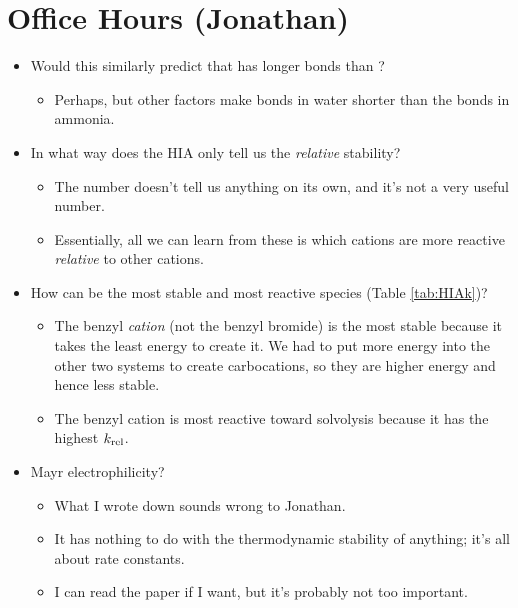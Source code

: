 \documentclass[../notes.tex]{subfiles}
\begin{document}
\section{Office Hours (Jonathan)}
\begin{itemize}
    \item Would this similarly predict that  has longer bonds than ?
    \begin{itemize}
        \item Perhaps, but other factors make  bonds in water shorter than the  bonds in ammonia.
    \end{itemize}
    \item In what way does the HIA only tell us the \emph{relative} stability?
    \begin{itemize}
        \item The number doesn't tell us anything on its own, and it's not a very useful number.
        \item Essentially, all we can learn from these is which cations are more reactive \emph{relative} to other cations.
    \end{itemize}
    \item How can  be the most stable and most reactive species (Table \ref{tab:HIAk})?
    \begin{itemize}
        \item The benzyl \emph{cation} (not the benzyl bromide) is the most stable because it takes the least energy to create it. We had to put more energy into the other two systems to create carbocations, so they are higher energy and hence less stable.
        \item The benzyl cation is most reactive toward solvolysis because it has the highest $k_\textup{rel}$.
    \end{itemize}
    \item Mayr electrophilicity?
    \begin{itemize}
        \item What I wrote down sounds wrong to Jonathan.
        \item It has nothing to do with the thermodynamic stability of anything; it's all about rate constants.
        \item I can read the paper if I want, but it's probably not too important.
    \end{itemize}
\end{itemize}
\end{document}
